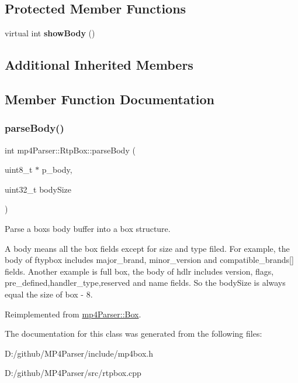 \subsection*{Protected Member Functions}
\begin{DoxyCompactItemize}
\item 
\mbox{\label{classmp4_parser_1_1_rtp_box_a5dbdbf54f4d64909686847e72868a469}} 
virtual int {\bfseries show\+Body} ()
\end{DoxyCompactItemize}
\subsection*{Additional Inherited Members}


\subsection{Member Function Documentation}
\mbox{\label{classmp4_parser_1_1_rtp_box_a732f4387776dc70dbb26c7e9219c65ef}} 
\subsubsection{\texorpdfstring{parseBody()}{parseBody()}}
{\footnotesize\ttfamily int mp4\+Parser\+::\+Rtp\+Box\+::parse\+Body (\begin{DoxyParamCaption}\item[{uint8\+\_\+t $\ast$}]{p\+\_\+body,  }\item[{uint32\+\_\+t}]{body\+Size }\end{DoxyParamCaption})\hspace{0.3cm}{\ttfamily [virtual]}}



Parse a box\textquotesingle{}s body buffer into a box structure. 

A body means all the box fields except for size and type filed. For example, the body of ftypbox includes major\+\_\+brand, minor\+\_\+version and compatible\+\_\+brands\mbox{[}\mbox{]} fields. Another example is full box, the body of hdlr includes version, flags, pre\+\_\+defined,handler\+\_\+type,reserved and name fields. So the body\+Size is always equal the size of box -\/ 8. 

Reimplemented from \mbox{\hyperlink{classmp4_parser_1_1_box_a3dd0c084ac65bc77b69ac5ecaf796cb2}{mp4\+Parser\+::\+Box}}.



The documentation for this class was generated from the following files\+:\begin{DoxyCompactItemize}
\item 
D\+:/github/\+M\+P4\+Parser/include/mp4box.\+h\item 
D\+:/github/\+M\+P4\+Parser/src/rtpbox.\+cpp\end{DoxyCompactItemize}
